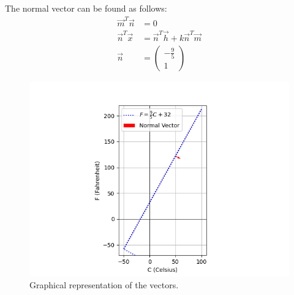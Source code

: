 \documentclass[journal]{IEEEtran}
\begin{document}
The normal vector can be found as follows:
\begin{align}
	\vec{m}^{T} \vec{n} &= 0 \\
	\vec{n}^{T} \vec{x} &= \vec{n}^{T} \vec{h} + k\vec{n}^{T} \vec{m} \\
	\vec{n} &= \begin{pmatrix} -\frac{9}{5} \\ 1 \end{pmatrix}
\end{align}

\begin{figure}[h!]
    \centering
    \includegraphics[width = 1\linewidth]{figs/fig.png}
    \caption{Graphical representation of the vectors.}
    \label{fig:stemplot}
\end{figure}
\end{document}
